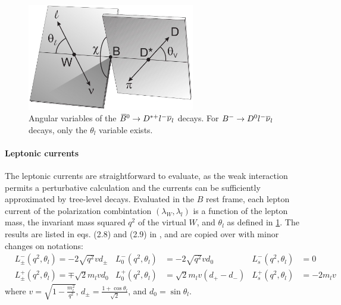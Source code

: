 \begin{figure}[!htb]
    \centering
    \includegraphics[width=0.65\textwidth]{./figs-theory/b_d_angular_vars.pdf}
    \caption{
        Angular variables of the ${{\kern 0.18em\overline{\kern -0.18em B}}{}^0} \rightarrow D^{*+} {l^-}{{\overline{\nu}}_l}$ decays.
        For ${{{B}^-}} \rightarrow {\ensuremath{{D}^0}}{\ensuremath{l^-}}{\ensuremath{{\overline{\nu}}_l}}$ decays,
        only the $\theta_l$ variable exists.
    }
    \label{fig:b-d-decay-schematic}
\end{figure}

\paragraph{Leptonic currents}
The leptonic currents are straightforward to evaluate,
as the weak interaction permits a perturbative calculation and the currents can
be sufficiently approximated by tree-level decays.
Evaluated in the $B$ rest frame, each lepton current of the polarization combintation
$(\lambda_W, \lambda_l)$ is a function of the lepton mass,
the invariant mass squared $q^2$ of the virtual $W$,
and $\theta_l$ as defined in \cref{fig:b-d-decay-schematic}.
The results are listed in eqs. (2.8) and (2.9) in
\cite{HAGIWARA1989569}, and are copied over with minor changes on notations:
\begin{align}
    & L^-_\pm(q^2, \theta_l) = -2 \sqrt{q^2} v d_\pm
    & L^-_0(q^2, \theta_l) &= -2 \sqrt{q^2} v d_0
    & L^-_s(q^2, \theta_l) &= 0
    \label{eqn:b-d-l-current-1} \\
    & L^+_\pm(q^2, \theta_l) = \mp \sqrt{2} m_l v d_0
    & L^+_0(q^2, \theta_l) &= \sqrt{2} m_l v(d_+ - d_-)
    & L^+_s(q^2, \theta_l) &= -2 m_l v
    \label{eqn:b-d-l-current-2}
\end{align}
where $v = \sqrt{1 - \frac{m^2_l}{q^2}}$,
$d_\pm = \frac{1 + \cos\theta_l}{\sqrt{2}}$, and $d_0 = \sin\theta_l$.

